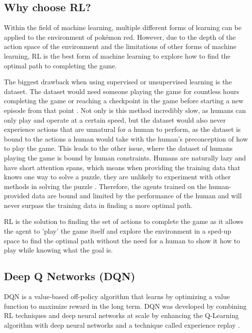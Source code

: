 \subsection{Why choose RL?}

Within the field of machine learning, multiple different forms of learning can be applied to the environment of pokémon red. However, due to the depth of the action space of the environment and the limitations of other forms of machine learning, RL is the best form of machine learning to explore how to find the optimal path to completing the game. 

The biggest drawback when using supervised or unsupervised learning is the dataset. The dataset would need someone playing the game for countless hours completing the game or reaching a checkpoint in the game before starting a new episode from that point \cite{XanderSteenbrugge2019intro}. Not only is this method incredibly slow, as humans can only play and operate at a certain speed, but the dataset would also never experience actions that are unnatural for a human to perform, as the dataset is bound to the actions a human would take with the human's preconception of how to play the game. This leads to the other issue, where the dataset of humans playing the game is bound by human constraints. Humans are naturally lazy and have short attention spans, which means when providing the training data that knows one way to solve a puzzle, they are unlikely to experiment with other methods in solving the puzzle \cite{XanderSteenbrugge2019intro}. Therefore, the agents trained on the human-provided data are bound and limited by the performance of the human and will never surpass the training data in finding a more optimal path. 

RL is the solution to finding the set of actions to complete the game as it allows the agent to 'play' the game itself and explore the environment in a sped-up space to find the optimal path without the need for a human to show it how to play while knowing what the goal is. 

\subsection{Deep Q Networks (DQN)}

DQN is a value-based off-policy algorithm that learns by optimizing a value function to maximize reward in the long term. DQN was developed by combining RL techniques and deep neural networks at scale by enhancing the Q-Learning algorithm with deep neural networks and a technique called experience replay \cite{TFAgentsAuthors2023}.

